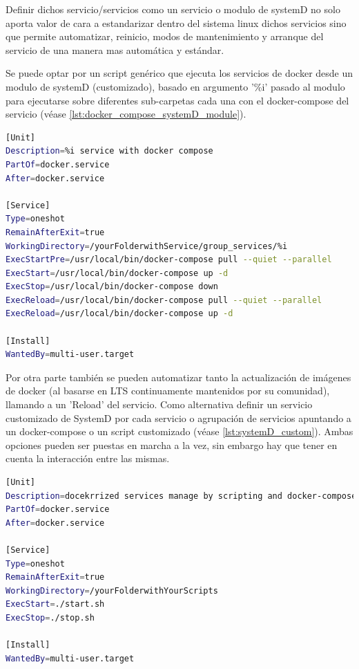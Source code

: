 Definir dichos servicio/servicios como un servicio o modulo de systemD\cite{c_systemd} no solo aporta valor de cara a estandarizar dentro del sistema linux dichos servicios sino que permite automatizar, reinicio, modos de mantenimiento y arranque del servicio de una manera mas automática y estándar.

Se puede optar por un script genérico que ejecuta los servicios de docker desde un modulo de systemD (customizado), basado en argumento '\%i' pasado al modulo para ejecutarse sobre diferentes sub-carpetas cada una con el docker-compose del servicio (véase \ref{lst:docker_compose_systemD_module}).

\begin{lstlisting}[language=bash, caption={SystemD /etc/systemd/system/docker-compose@.service}, label={lst:docker_compose_systemD_module} ]
[Unit]
Description=%i service with docker compose
PartOf=docker.service
After=docker.service

[Service]
Type=oneshot
RemainAfterExit=true
WorkingDirectory=/yourFolderwithService/group_services/%i
ExecStartPre=/usr/local/bin/docker-compose pull --quiet --parallel
ExecStart=/usr/local/bin/docker-compose up -d
ExecStop=/usr/local/bin/docker-compose down
ExecReload=/usr/local/bin/docker-compose pull --quiet --parallel
ExecReload=/usr/local/bin/docker-compose up -d

[Install]
WantedBy=multi-user.target
\end{lstlisting}

Por otra parte también se pueden automatizar tanto la actualización de imágenes de docker (al basarse en LTS continuamente mantenidos por su comunidad), llamando a un 'Reload' del servicio. Como alternativa definir un servicio customizado de SystemD por cada servicio o agrupación de servicios apuntando a un docker-compose o un script customizado (véase \ref{lst:systemD_custom}). Ambas opciones pueden ser puestas en marcha a la vez, sin embargo hay que tener en cuenta la interacción entre las mismas.

\begin{lstlisting}[language=bash, caption={SystemD /etc/systemd/system/custom-service}, label={lst:systemD_custom} ]
[Unit]
Description=docekrrized services manage by scripting and docker-compose
PartOf=docker.service
After=docker.service

[Service]
Type=oneshot
RemainAfterExit=true
WorkingDirectory=/yourFolderwithYourScripts
ExecStart=./start.sh 
ExecStop=./stop.sh 

[Install]
WantedBy=multi-user.target
\end{lstlisting}

